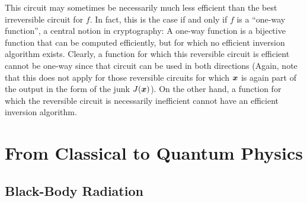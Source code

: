 This circuit may sometimes be necessarily much less efficient than the best irreversible circuit for $f$.  
In fact, this is the case if and only if $f$ is a ``one-way function'', a central notion in cryptography: 
A one-way function is a bijective function that can be computed efficiently, 
but for which no efficient inversion algorithm exists. 
Clearly, a function for which this reversible circuit is efficient cannot be one-way since that circuit can be used in both directions
(Again, note that this does not apply for those reversible circuits for which ${\boldsymbol{x}}$ is again part of the output in the form of the junk $J({\boldsymbol{x}})$). 
On the other hand, a function for which the reversible circuit is necessarily inefficient cannot have an efficient inversion algorithm. %





\clearpage
\section{From Classical to Quantum Physics}\label{sec:classical-to-quantum}


\subsection{Black-Body Radiation}\label{sec:black-body-radiation}

